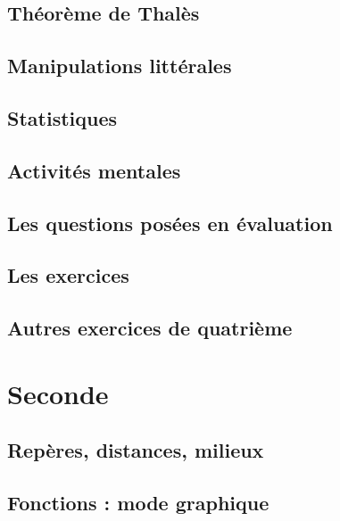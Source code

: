 \documentclass[a4paper,10pt]{book}
\begin{document}
\chapter{Théorème de Thalès}


\chapter{Manipulations littérales}


\chapter{Statistiques}


\chapter{Activités mentales}


\chapter{Les questions posées en évaluation}


\chapter{Les exercices}


\chapter{Autres exercices de quatrième}


\part{Seconde}

\chapter{Repères, distances, milieux}


\chapter{Fonctions : mode graphique}

\end{document}
